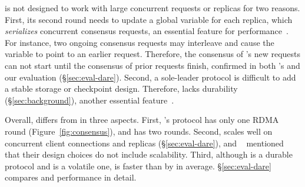 

\dare is not designed to work with large concurrent requests or 
replicas for two reasons. First, its second round needs to update a global 
variable for each replica, which \emph{serializes} concurrent consensus 
requests, an essential feature for \paxos performance~\cite{paxos:practical}. 
For instance, two ongoing \dare consensus requests may interleave and cause the 
variable to point to an earlier request. Therefore, the consensus of \dare's 
new requests can not start until the consensus of prior requests finish, 
confirmed in both \dare's and our evaluation (\S\ref{sec:eval-dare}). Second, a 
sole-leader protocol is difficult to add a stable storage or 
checkpoint design. Therefore, \dare lacks durability 
(\S\ref{sec:background}), another essential \paxos 
feature~\cite{lyu1995software}.



Overall, \xxx differs from \dare in three aspects. First, \xxx's protocol has 
only one RDMA round (Figure~\ref{fig:consensus}), and \dare has two rounds. 
Second, \xxx scales well on concurrent client connections and replicas 
(\S\ref{sec:eval-dare}), and \dare~\cite{dare:hpdc15} mentioned that their 
design choices do not include scalability. Third, although \xxx is a durable 
protocol and \dare is a volatile one, \xxx is faster than \dare by \fasterDARE 
in average. \S\ref{sec:eval-dare} compares \xxx and \dare performance in 
detail.

